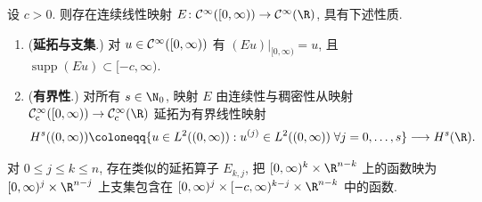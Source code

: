 \begin{theorem}\label{thm:9.25}
设 $c > 0$. 则存在连续线性映射 $E \colon \Smooth([0, \infty)) \to \Smooth(\R)$, 具有下述性质.
\begin{enumerate}
    \item (\textbf{延拓与支集}.) 对 $u \in \mathcal{C}^\infty([0, \infty))$ 有 $(Eu)|_{[0, \infty)} = u$, 且 $\operatorname{supp}(Eu) \subset [-c, \infty)$.
    \item (\textbf{有界性}.) 对所有 $s \in \N_0$, 映射 $E$ 由连续性与稠密性从映射 $\SmoothComp([0, \infty)) \to \SmoothComp(\R)$ 延拓为有界线性映射
    \begin{equation}\label{eq:9.72}
        H^s((0, \infty)) \defeq \{u \in L^2((0, \infty)) : u^{(j)} \in L^2((0, \infty)) \; \forall j = 0, \ldots, s\} \longrightarrow H^s(\R).
    \end{equation}
\end{enumerate}
对 $0 \le j \le k \le n$, 存在类似的延拓算子 $E_{k,j}$, 把 $[0, \infty)^k \times \R^{n-k}$ 上的函数映为 $[0, \infty)^j \times \R^{n-j}$ 上支集包含在 $[0, \infty)^j \times [-c, \infty)^{k-j} \times \R^{n-k}$ 中的函数.
\end{theorem}

